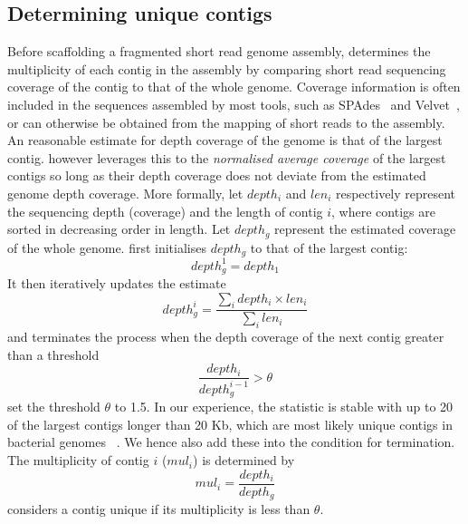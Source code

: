 \subsection{Determining unique contigs}
Before scaffolding a fragmented short read genome assembly, \npscarf{}
determines the multiplicity of each contig in the assembly by comparing short
read sequencing coverage of the contig to that of the whole genome. Coverage
information is often included in the sequences assembled by most tools, such as
SPAdes~\cite{BankevichNA2012} and Velvet~\cite{Zerbino2008}, or can otherwise 
be obtained from the mapping of short reads to the assembly. 
An reasonable estimate for depth coverage of the genome is that of the largest
contig. \npscarf{} however leverages this to the \emph{normalised average
coverage} of the largest contigs so long as their depth coverage does not
deviate from the estimated genome depth coverage.
More formally, let $depth_i$ and $len_i$ respectively represent the sequencing
depth (coverage) and the length of contig $i$, where contigs are sorted in
decreasing order in length. Let $depth_g$ represent the estimated coverage
of the whole genome. \npscarf{} first initialises $depth_g$ to that of the
largest contig:
\begin{equation}\label{E:depth}
depth_g^1 = depth_1
\end{equation}
It then iteratively updates the estimate   
\begin{equation}\label{E:gdepth}
depth_g^i = \dfrac{\sum_i depth_i \times len_i}{\sum_i len_i} 
\end{equation}
and terminates the process when the depth coverage of the next contig greater
than a threshold
\begin{equation}\label{E:cov}
\dfrac{depth_i}{depth_g^{i-1}} > \theta
\end{equation}
\npscarf{} set the threshold $\theta$ to 1.5. In our experience, the statistic is
stable with up to 20 of the largest contigs longer than 20 Kb, which are most
likely unique contigs in bacterial genomes ~\cite{KorenP2015}. We hence also
add these into the condition for termination.
The multiplicity of contig $i$ ($mul_i$) is determined by
\begin{equation}\label{E:mul}
mul_i= \dfrac{depth_i}{depth_g}
\end{equation}
\npscarf{} considers a contig unique if its multiplicity is less than $\theta$.
 


